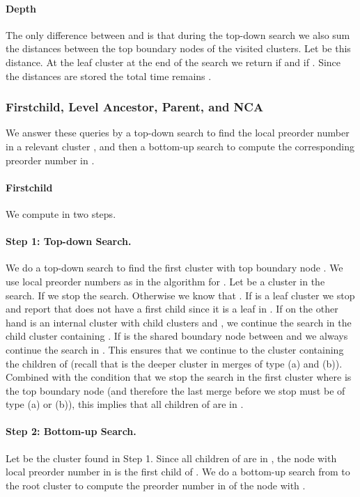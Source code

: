 \documentclass [11pt]{article}
\begin{document}
\paragraph{Depth}  The only difference between  and   is that during the top-down search we also sum the distances between the top boundary nodes of the visited clusters. Let  be this distance. At the leaf cluster at the end of the search we return  if  and  if . 
Since the distances are stored the total time remains . 




\subsubsection{Firstchild, Level Ancestor, Parent, 
and NCA}
We answer these queries by a top-down search to find the local preorder number in a relevant cluster , and then a bottom-up search to compute the corresponding preorder number in .

\paragraph{Firstchild} We compute  in two steps. 
\paragraph{Step 1: Top-down Search.} We do a top-down search to find the first cluster with top boundary node . We use local preorder numbers as in the algorithm for . Let  be a cluster in the search. If  we stop the search. Otherwise we know that . If  is a leaf cluster we stop and report that  does not have a first child since it is a leaf in . 
 If on the other hand  is an internal cluster with child clusters  and , we continue the search in the child cluster containing . If  is the shared boundary node between  and  we always continue the search in . 
This ensures that we continue to the cluster containing the children of  (recall that  is the deeper cluster in merges of type (a) and (b)). Combined with the condition that we stop the search in the first cluster  where  is the top boundary node (and therefore the last merge before we stop must be of type (a) or (b)), this implies that all children of  are in . 

\paragraph{Step 2: Bottom-up Search.} Let  be the cluster found in Step 1. Since all children of  are in , the node with local preorder number  in  is the first child of . We do a bottom-up search from  to the root cluster to compute the preorder number in  of the node with .  
\end{document}
